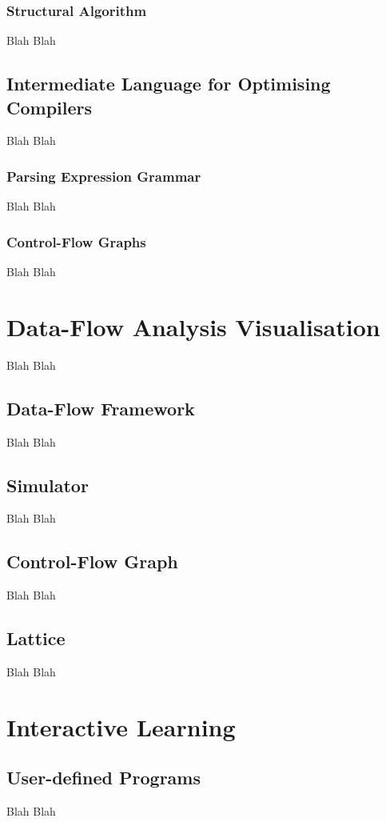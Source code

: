 \documentclass[bsc,twoside,singlespacing,parskip,logo]{infthesis}     %
\begin{document}
    	\subsection{Structural Algorithm}
		Blah Blah
        
	\section{Intermediate Language for Optimising Compilers}
	Blah Blah
    
    	\subsection{Parsing Expression Grammar}
		Blah Blah
    
    	\subsection{Control-Flow Graphs}
        Blah Blah


\chapter{Data-Flow Analysis Visualisation}
Blah Blah

	\section{Data-Flow Framework}
	Blah Blah
    
    \section{Simulator}
	Blah Blah
    
    \section{Control-Flow Graph}
	Blah Blah
    
    \section{Lattice}
	Blah Blah
    

\chapter{Interactive Learning}

	\section{User-defined Programs}
	Blah Blah
    
\end{document}

